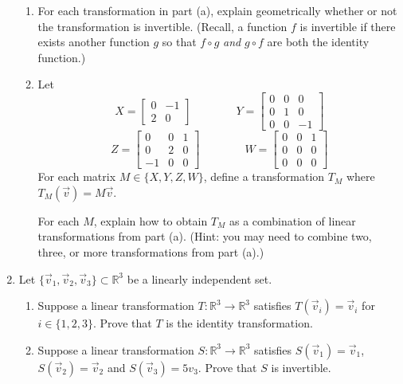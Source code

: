 \documentclass[letter]{article}
\newcommand{\R}{\mathbb{R}}
\newcommand{\mat}[1]{\begin{bmatrix}#1\end{bmatrix}}
\begin{document}
\begin{enumerate}
\begin{enumerate}
		
		\item For each transformation in part (a), explain geometrically whether or not the transformation is invertible.
			(Recall, a function $f$ is invertible if there exists another function $g$ so that $f\circ g$ \emph{and}
				$g\circ f$ are both the identity function.)
		
		
		\item Let
			\[
				X=\mat{0 & -1 \\ 2 & 0}
				\qquad \qquad
				Y=\mat{0 & 0 & 0\\ 0 & 1 & 0 \\ 0 & 0 & -1}
			\]
			\[
				Z=\mat{0 & 0 & 1 \\ 0 & 2 & 0 \\ -1 & 0 & 0}
				\qquad\qquad
				W=\mat{0 & 0 & 1 \\ 0 & 0 & 0 \\ 0 & 0 & 0}
			\]
			For each matrix $M\in\{X,Y,Z,W\}$, define a transformation $T_M$ where $T_M(\vec v) = M\vec v$.

			For each $M$, explain how to obtain $T_M$ as a combination of linear transformations from part (a).
				(Hint: you may need to combine two, three, or more transformations from part (a).)
		\end{enumerate}

		\item Let $\{\vec v_1,\vec v_2,\vec v_3\}\subset \R^3$ be a linearly independent set.
			\begin{enumerate}
				\item Suppose a linear transformation $T:\R^3\to\R^3$ satisfies $T(\vec v_i) = \vec v_i$ for $i\in\{1,2,3\}$.
					Prove that $T$ is the identity transformation.
				\item Suppose a linear transformation $S:\R^3\to\R^3$ satisfies $S(\vec v_1)=\vec v_1$,
					$S(\vec v_2)=\vec v_2$ and $S(\vec v_3)=5 v_3$.  Prove that $S$ is invertible.
			\end{enumerate}
	\end{enumerate}
\end{document}
